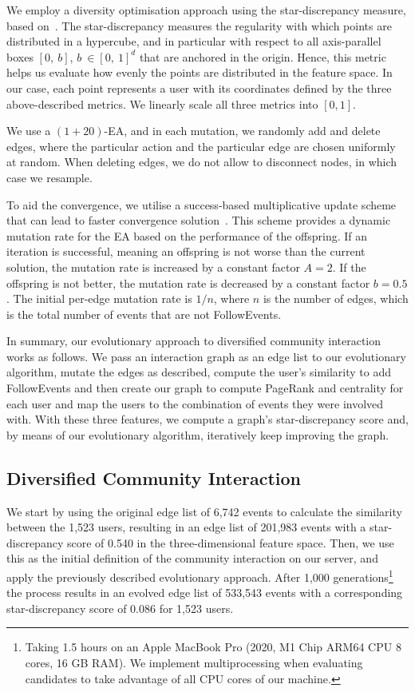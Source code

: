 \documentclass[dvipsnames,format=sigconf,anonymous=False,review=false, balance=false]{acmart}
\begin{document}
We employ a diversity optimisation approach using the star-discrepancy measure, based on~\cite{neumann2018discrepancy}. The star-discrepancy measures the regularity with which points are distributed in a hypercube, and in particular with respect to all axis-parallel boxes $\left[0,\ b\right]$, $b\ \in\left[0,\ 1\right]^d$ that are anchored in the origin. Hence, this metric helps us evaluate how evenly the points are distributed in the feature space. In our case, each point  represents a user with its coordinates defined by the three above-described metrics. 
We linearly scale all three metrics into $\left[ 0,1 \right]$.

We use a $\left(1+20\right)$-EA, and in each mutation, we randomly add and delete edges, where the particular action and the particular edge are chosen uniformly at random. 
When deleting edges, we do not allow to disconnect nodes, in which case we resample. 

To aid the convergence, we utilise a success-based multiplicative update scheme that can lead to faster convergence solution~\cite{doerr2018parameterselection}. This scheme provides a dynamic mutation rate for the EA based on the performance of the offspring. If an iteration is successful, meaning an offspring is not worse than the current solution, the mutation rate is increased by a constant factor $A=2$. If the offspring is not better, the mutation rate is decreased by a constant factor $b=0.5$. The initial per-edge mutation rate is $1/n$, where $n$ is the number of edges, which is the total number of events that are not FollowEvents.

In summary, our evolutionary approach to diversified community interaction works as follows. We pass an interaction graph as an edge list to our evolutionary algorithm, mutate the edges as described, compute the user’s similarity to add FollowEvents and then create our graph to compute PageRank and centrality for each user and map the users to the combination of events they were involved with. With these three features, we compute a graph's star-discrepancy score and, by means of our evolutionary algorithm, iteratively keep improving the graph. 

\subsection{Diversified Community Interaction}

We start by using the original edge list of 6,742 events to calculate the similarity between the 1,523 users, resulting in an edge list of 201,983 events with a star-discrepancy score of 0.540 in the three-dimensional feature space. Then, we use this as the initial definition of the community interaction on our server, and apply the previously described evolutionary approach. After 1,000 generations\footnote{Taking 1.5 hours on an Apple MacBook Pro (2020, M1 Chip ARM64 CPU 8 cores, 16 GB RAM). We implement multiprocessing when evaluating candidates to take advantage of all CPU cores of our machine.} the process results in an evolved edge list of 533,543 events with a corresponding star-discrepancy score of 0.086 for 1,523 users. 
\end{document}
